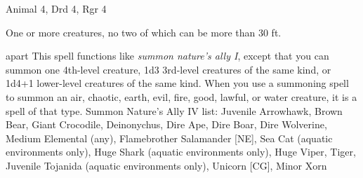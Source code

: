 
\begin{description*}
\item[Level:] Animal 4, Drd 4, Rgr 4
\item[Effect:] One or more creatures, no two of which can be more than 30 ft.
\end{description*}

apart
This spell functions like \textit{summon nature's ally I}, except that you can
summon one 4th-level creature, 1d3 3rd-level creatures of the same kind, or 1d4+1
lower-level creatures of the same kind.
When you use a summoning spell to summon an air, chaotic, earth, evil, fire, good,
lawful, or water creature, it is a spell of that type.
Summon Nature's Ally IV list: Juvenile Arrowhawk, Brown Bear, Giant Crocodile, Deinonychus, Dire Ape, Dire Boar, Dire Wolverine, Medium Elemental (any), Flamebrother Salamander [NE], Sea Cat (aquatic environments only), Huge Shark (aquatic environments only), Huge Viper, Tiger, Juvenile Tojanida (aquatic environments only), Unicorn [CG], Minor Xorn